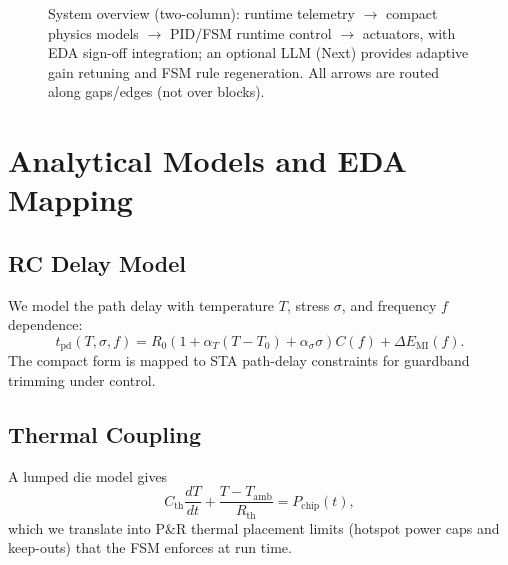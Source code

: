 \documentclass[conference]{IEEEtran}
\begin{document}
\begin{figure}[t]
\caption{System overview (two-column): runtime telemetry $\rightarrow$ compact physics models $\rightarrow$ PID/FSM runtime control $\rightarrow$ actuators, with EDA sign-off integration; an optional LLM (Next) provides adaptive gain retuning and FSM rule regeneration. All arrows are routed along gaps/edges (not over blocks).}
\label{fig:system}
\end{figure}

\section{Analytical Models and EDA Mapping}
\subsection{RC Delay Model}
We model the path delay with temperature $T$, stress $\sigma$, and frequency $f$ dependence:
\begin{equation}
t_{\mathrm{pd}}(T,\sigma,f)=R_0\!\left(1+\alpha_T(T-T_0)+\alpha_\sigma\sigma\right)C(f)+\Delta E_{\mathrm{MI}}(f).
\end{equation}
The compact form is mapped to STA path-delay constraints for guardband trimming under control.

\subsection{Thermal Coupling}
A lumped die model gives
\begin{equation}
C_{\mathrm{th}}\frac{dT}{dt}+\frac{T-T_{\mathrm{amb}}}{R_{\mathrm{th}}}=P_{\mathrm{chip}}(t),
\end{equation}
which we translate into P\&R thermal placement limits (hotspot power caps and keep-outs) that the FSM enforces at run time.
\end{document}
